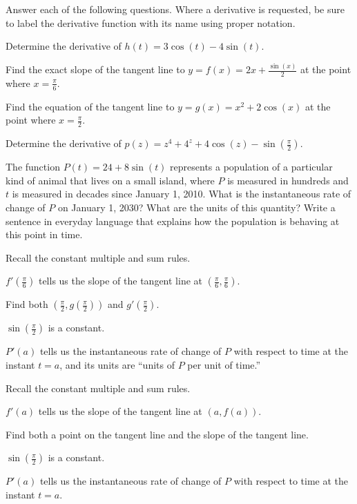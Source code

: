 \begin{activity} \label{A:2.2.3}  Answer each of the following questions.  Where a derivative is requested, be sure to label the derivative function with its name using proper notation.
\ba
	\item Determine the derivative of $h(t) = 3\cos(t) - 4\sin(t)$.
	\item Find the exact slope of the tangent line to $y = f(x) = 2x + \frac{\sin(x)}{2}$ at the point where $x = \frac{\pi}{6}$.
	\item Find the equation of the tangent line to $y = g(x) = x^2 + 2\cos(x)$ at the point where $x = \frac{\pi}{2}$.
	\item Determine the derivative of $p(z) = z^4 + 4^z + 4\cos(z) - \sin(\frac{\pi}{2})$.
	\item The function $P(t) = 24 + 8\sin(t)$ represents a population of a particular kind of animal that lives on a small island, where $P$ is measured in hundreds and $t$ is measured in decades since January 1, 2010.  What is the instantaneous rate of change of $P$ on January 1, 2030?  What are the units of this quantity?  Write a sentence in everyday language that explains how the population is behaving at this point in time.
\ea

\end{activity}
\begin{smallhint}
\ba
	\item Recall the constant multiple and sum rules.
	\item $f'(\frac{\pi}{6})$ tells us the slope of the tangent line at $(\frac{\pi}{6},\frac{\pi}{6})$.
	\item Find both $(\frac{\pi}{2}, g(\frac{\pi}{2}))$ and $g'(\frac{\pi}{2})$.
	\item $\sin(\frac{\pi}{2})$ is a constant.
	\item $P'(a)$ tells us the instantaneous rate of change of $P$ with respect to time at the instant $t = a$, and its units are ``units of $P$ per unit of time.''
\ea
\end{smallhint}
\begin{bighint}
\ba
	\item Recall the constant multiple and sum rules.
	\item $f'(a)$ tells us the slope of the tangent line at $(a,f(a))$.
	\item Find both a point on the tangent line and the slope of the tangent line.
	\item $\sin(\frac{\pi}{2})$ is a constant.
	\item $P'(a)$ tells us the instantaneous rate of change of $P$ with respect to time at the instant $t = a$.
\ea
\end{bighint}
